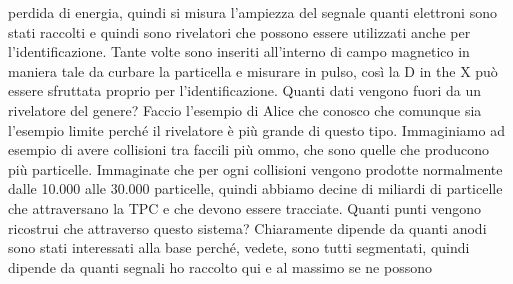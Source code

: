 perdida di energia, quindi si misura l'ampiezza del segnale quanti elettroni sono stati raccolti e quindi sono rivelatori che possono essere utilizzati anche per l'identificazione. Tante volte sono inseriti all'interno di campo magnetico in maniera tale da curbare la particella e misurare in pulso, così la D in the X può essere sfruttata proprio per l'identificazione. Quanti dati vengono fuori da un rivelatore del genere? Faccio l'esempio di Alice che conosco che comunque sia l'esempio limite perché il rivelatore è più grande di questo tipo. Immaginiamo ad esempio di avere collisioni tra faccili più ommo, che sono quelle che producono più particelle. Immaginate che per ogni collisioni vengono prodotte normalmente dalle 10.000 alle 30.000 particelle, quindi abbiamo decine di miliardi di particelle che attraversano la TPC e che devono essere tracciate. Quanti punti vengono ricostrui che attraverso questo sistema? Chiaramente dipende da quanti anodi sono stati interessati alla base perché, vedete, sono tutti segmentati, quindi dipende da quanti segnali ho raccolto qui e al massimo se ne possono 

